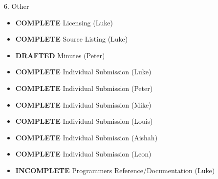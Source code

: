 6. Other
\begin{itemize}
\item \textbf{COMPLETE}   Licensing (Luke)
\item \textbf{COMPLETE}   Source Listing (Luke)
\item \textbf{DRAFTED}    Minutes (Peter)
\item \textbf{COMPLETE}   Individual Submission (Luke)
\item \textbf{COMPLETE}   Individual Submission (Peter)
\item \textbf{COMPLETE}   Individual Submission (Mike)
\item \textbf{COMPLETE}   Individual Submission (Louis)
\item \textbf{COMPLETE}   Individual Submission (Aishah)
\item \textbf{COMPLETE}   Individual Submission (Leon)
\item \textbf{INCOMPLETE} Programmers Reference/Documentation (Luke)
\end{itemize}
